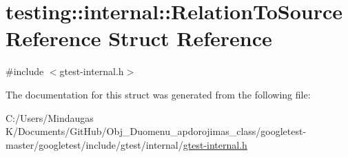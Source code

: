 \hypertarget{structtesting_1_1internal_1_1_relation_to_source_reference}{}\section{testing\+::internal\+::Relation\+To\+Source\+Reference Struct Reference}
\label{structtesting_1_1internal_1_1_relation_to_source_reference}


{\ttfamily \#include $<$gtest-\/internal.\+h$>$}



The documentation for this struct was generated from the following file\+:\begin{DoxyCompactItemize}
\item 
C\+:/\+Users/\+Mindaugas K/\+Documents/\+Git\+Hub/\+Obj\+\_\+\+Duomenu\+\_\+apdorojimas\+\_\+class/googletest-\/master/googletest/include/gtest/internal/\mbox{\hyperlink{googletest-master_2googletest_2include_2gtest_2internal_2gtest-internal_8h}{gtest-\/internal.\+h}}\end{DoxyCompactItemize}
